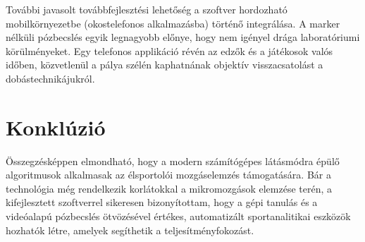 További javasolt továbbfejlesztési lehetőség a szoftver hordozható mobilkörnyezetbe (okostelefonos alkalmazásba) történő integrálása. A marker nélküli pózbecslés egyik legnagyobb előnye, hogy nem igényel drága laboratóriumi körülményeket. Egy telefonos applikáció révén az edzők és a játékosok valós időben, közvetlenül a pálya szélén kaphatnának objektív visszacsatolást a dobástechnikájukról.

\section{Konklúzió}
Összegzésképpen elmondható, hogy a modern számítógépes látásmódra épülő algoritmusok alkalmasak az élsportolói mozgáselemzés támogatására. Bár a technológia még rendelkezik korlátokkal a mikromozgások elemzése terén, a kifejlesztett szoftverrel sikeresen bizonyítottam, hogy a gépi tanulás és a videóalapú pózbecslés ötvözésével értékes, automatizált sportanalitikai eszközök hozhatók létre, amelyek segíthetik a teljesítményfokozást.
